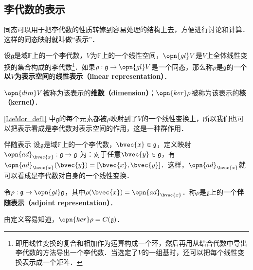 \subsection{李代数的表示}

同态可以用于把李代数的性质转嫁到容易处理的结构上去，方便进行讨论和计算．这样的同态映射就叫做“表示”．

\begin{definition}{}\label{LieMor_def1}
设$\mathfrak{g}$是域$\mathbb{F}$上的一个李代数，$V$为$\mathbb{F}$上的一个线性空间，$\opn{gl}V$是$V$上全体线性变换的集合构成的李代数\footnote{即用线性变换的复合和相加作为运算构成一个环，然后再用从结合代数中导出李代数的方法导出一个李代数．当选定了$V$的一组基时，还可以把每个线性变换表示成一个矩阵．}．如果$\rho:\mathfrak{g}\to \opn{gl}V$是一个同态，那么称$\rho$是$\mathfrak{g}$的一个\textbf{以}$V$\textbf{为表示空间}的\textbf{线性表示（linear representation）}．

$\opn{dim} V$被称为该表示的\textbf{维数（dimension）}；$\opn{ker}\rho$被称为该表示的\textbf{核（kernel）}．
\end{definition}

\autoref{LieMor_def1} 中$\mathfrak{g}$的每个元素都被$\rho$映射到了$V$的一个线性变换上，所以我们也可以把表示看成是李代数对表示空间的作用，这是一种群作用．



\begin{example}{伴随表示}
设$\mathfrak{g}$是域$\mathbb{F}$上的一个李代数，$\bvec{x}\in\mathfrak{g}$，定义映射 $\opn{ad}_{\bvec{x}} :\mathfrak{g}\to\mathfrak{g}$ 为：对于任意$\bvec{y}\in\mathfrak{g}$，有$\opn{ad}_{\bvec{x}}(\bvec{y})=[\bvec{x}, \bvec{y}]$．这样，$\opn{ad}_{\bvec{x}}$就可以看成是李代数对自身的一个线性变换．

令$\rho:\mathfrak{g}\to\opn{gl}\mathfrak{g}$，其中$\rho(\bvec{x})=\opn{ad}_{\bvec{x}}$．称$\rho$是$\mathfrak{g}$上的一个\textbf{伴随表示（adjoint representation）}．

由定义容易知道，$\opn{ker}\rho=C(\mathfrak{g})$．
\end{example}










